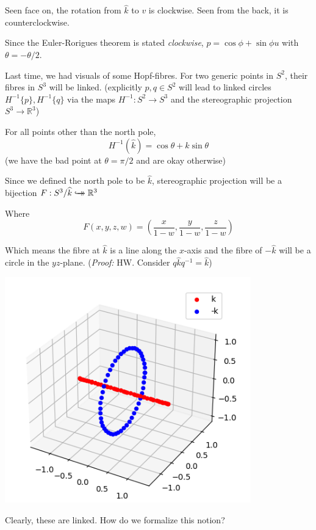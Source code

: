 \documentclass[12pt]{article}
\renewcommand{\hat}[1]{\widehat{#1}}
\newcommand{\R}{\mathbb{R}}
\newcommand{\biject}{\hookrightarrow \hspace{-8pt} \rightarrow}
\newcommand{\khat}{\hat{k}}
\begin{document}
    Seen face on, the rotation from $\khat$ to $v$ is clockwise. Seen from the back, it is counterclockwise. 

    Since the Euler-Rorigues theorem is stated \emph{clockwise}, $p = \cos \phi + \sin \phi u$ with $\theta = - \theta/2$.

    Last time, we had visuals of some Hopf-fibres. For two generic points in $S^2$, their fibres in $S^3$ will be linked. 
    (explicitly $p, q \in S^2$ will lead to linked circles $H^{-1}\{p\}, H^{-1}\{q\}$ via the maps $H^{-1}: S^2 \to S^3$ and the stereographic projection $S^3 \to \R^3$)

    For all points other than the north pole, 
    \[H^{-1}(\khat) = \cos \theta + \khat \sin \theta\]
    (we have the bad point at $\theta = \pi/2$ and are okay otherwise)

    Since we defined the north pole to be $\khat$, stereographic projection will be a bijection $F: S^3/\khat \biject \R^3$ 

    Where 
    \[F(x, y, z, w) = \left(\frac{x}{1 - w}, \frac{y}{1- w}, \frac{z}{1 - w}\right)\] 

    Which means the fibre at $\khat$ is a line along the $x$-axis and the fibre of $-\khat$ will be a circle in the $yz$-plane. (\emph{{Proof:}} HW. Consider $q\khat q^{-1} = \khat$)

    \begin{center}
        \includegraphics[width=0.8\textwidth]{Images/k fibres.png}
    \end{center}

    Clearly, these are linked. How do we formalize this notion? 
\end{document}
